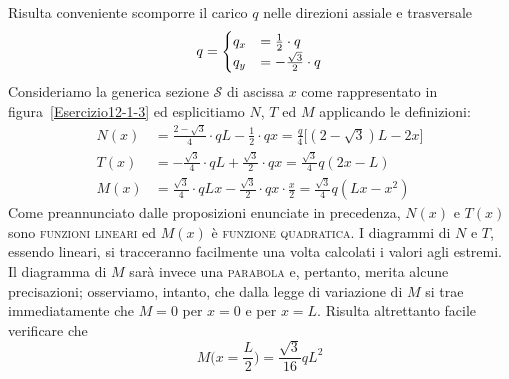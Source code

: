Risulta conveniente scomporre il carico $q$ nelle direzioni assiale e trasversale
\begin{equation*}
q = 
\begin{cases}
q_{x} &= \frac{1}{2}\cdot q            \notag \\
q_{y} &= -\frac{\sqrt{3}}{2}\cdot q  \notag 
\end{cases}
\end{equation*}
Consideriamo la generica sezione $\mathcal{S}$ di ascissa $x$ come rappresentato in figura~\ref{Esercizio12-1-3} ed esplicitiamo $N$, $T$ ed $M$ applicando le definizioni:
\begin{subequations}
\begin{align}
N(x) &= \frac{2 - \sqrt{3}}{4}\cdot qL - \frac{1}{2}\cdot qx = \frac{q}{4} \biggl[ (2 - \sqrt{3}) L - 2x \biggr]  \label{equazione12-1-2a} \tag{12.1.2a} \\
T(x) &= -\frac{\sqrt{3}}{4}\cdot qL + \frac{\sqrt{3}}{2}\cdot qx = \frac{\sqrt{3}}{4} q  (2x - L)  \label{equazione12-1-2b} \tag{12.1.2b} \\ 
M(x) &= \frac{\sqrt{3}}{4}\cdot qLx - \frac{\sqrt{3}}{2}\cdot qx \cdot \frac{x}{2} = \frac{\sqrt{3}}{4} q  (Lx - x^{2})  \label{equazione12-1-2c} \tag{12.1.2c}
\end{align}
\end{subequations}
Come preannunciato dalle proposizioni enunciate in precedenza, $N(x)$ e $T(x)$ sono \textsc{funzioni lineari} ed $M(x)$ è \textsc{funzione quadratica}. I diagrammi di $N$ e $T$, essendo lineari, si tracceranno facilmente una volta calcolati i valori agli estremi. Il diagramma di $M$ sarà invece una \textsc{parabola} e, pertanto, merita alcune precisazioni; osserviamo, intanto, che dalla legge di variazione di $M$ si trae immediatamente che $M=0$ per $x=0$ e per $x=L$. Risulta altrettanto facile verificare che 
\begin{equation*}
\boxed{ M\biggl( x=\frac{L}{2} \biggr) = \frac{\sqrt{3}}{16} qL^{2} }
\end{equation*}
